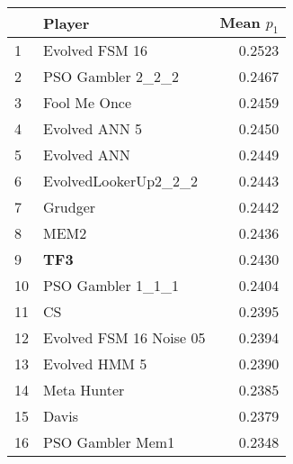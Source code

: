 \begin{tabular}{llr}
\toprule
{} &                   Player &  Mean $p_1$ \\
\midrule
1  &           Evolved FSM 16 &      0.2523 \\
2  &        PSO Gambler 2\_2\_2 &      0.2467 \\
3  &             Fool Me Once &      0.2459 \\
4  &            Evolved ANN 5 &      0.2450 \\
5  &              Evolved ANN &      0.2449 \\
6  &     EvolvedLookerUp2\_2\_2 &      0.2443 \\
7  &                  Grudger &      0.2442 \\
8  &                     MEM2 &      0.2436 \\
9  &                      \textbf{TF3} &      0.2430 \\
10 &        PSO Gambler 1\_1\_1 &      0.2404 \\
11 &                       CS &      0.2395 \\
12 &  Evolved FSM 16 Noise 05 &      0.2394 \\
13 &            Evolved HMM 5 &      0.2390 \\
14 &              Meta Hunter &      0.2385 \\
15 &                    Davis &      0.2379 \\
16 &         PSO Gambler Mem1 &      0.2348 \\
\bottomrule
\end{tabular}
